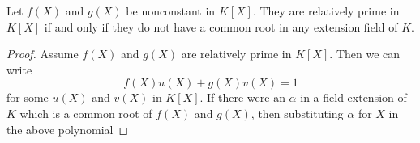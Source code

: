 \begin{corollary}
  Let $f(X)$ and $g(X)$ be nonconstant in $K[X]$. They are relatively prime
  in $K[X]$ if and only if they do not have a common root in any extension
  field of $K$.
\end{corollary}
\begin{proof}
  Assume $f(X)$ and $g(X)$ are relatively prime in $K[X]$. Then we can
  write
  \[
    f(X)u(X)+g(X)v(X)=1
  \]
  for some $u(X)$ and $v(X)$ in $K[X]$. If there were an $\alpha$ in a
  field extension of $K$ which is a common root of $f(X)$ and $g(X)$, then
  substituting $\alpha$ for $X$ in the above polynomial
\end{proof}


